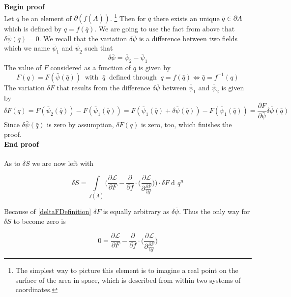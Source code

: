\documentclass{article}
\DeclareMathOperator{\dd}{d\!}
\begin{document}
\noindent \textbf{Begin proof}
\\
Let $q$ be an element of $\partial (f(\bar{A}))$.
\footnote{The simplest way to picture this element is to imagine a real point on the surface of the area in space, which is described from within two systems of coordinates.}
Then for $q$ there exists an unique $\bar{q} \in \partial \bar{A}$ which is defined by $q=f(\bar{q})$.
We are going to use the fact from above that $\delta \bar{\psi}(\bar{q}) = 0$.
We recall that the variation $\delta \bar{\psi}$ is a difference between two fields which we name $\bar{\psi}_1$ and $\bar{\psi}_2$ such that
\begin{equation}
    \delta \bar{\psi} = \bar{\psi}_2 - \bar{\psi}_1
\end{equation}
The value of $F$ considered as a function of $q$ is given by
\begin{equation}
    F(q) = F(\bar{\psi}(\bar{q})) \;\; \text{with} \;\; \bar{q} \;\; \text{defined through} \;\; q=f(\bar{q})
    \iff \bar{q} = f^{-1}(q)
\end{equation}
The variation $\delta F$ that results from the difference $\delta \bar{\psi}$ between $\bar{\psi}_1$ and $\bar{\psi}_2$ is given by
\begin{equation}
    \delta F(q) = F(\bar{\psi}_2(\bar{q})) - F(\bar{\psi}_1(\bar{q}))
    = F(\bar{\psi}_1(\bar{q}) + \delta \bar{\psi} (\bar{q})) - F(\bar{\psi}_1(\bar{q}))
    = \frac{\partial F}{\partial \bar{\psi}} \delta \bar{\psi} (\bar{q})
\end{equation}
Since $\delta \bar{\psi}(\bar{q})$ is zero by assumption, $\delta F(q)$ is zero, too, which finishes the proof.
\\
\textbf{End proof}
\\
\\

\noindent As to $\delta S$ we are now left with


\begin{equation}
    \delta S = \int\limits_{f(\bar{A})}
    \bigg(
    \frac{\partial \mathcal{L}}{\partial F}
    -\frac{\partial}{\partial f} \cdot \bigg( \frac{\partial \mathcal{L}}{\partial \frac{\partial F}{\partial f}} \bigg)\bigg) \cdot \delta F
    \dd q^n
\end{equation}

Because of \ref{deltaFDefinition} $\delta F$ is equally arbitrary as $\delta \bar{\psi}$. Thus the only way for $\delta S$ to become zero is

\begin{equation}
    0 =
    \frac{\partial \mathcal{L}}{\partial F}
    -\frac{\partial}{\partial f} \cdot \bigg( \frac{\partial \mathcal{L}}{\partial \frac{\partial F}{\partial f}} \bigg)
\end{equation}
\end{document}
